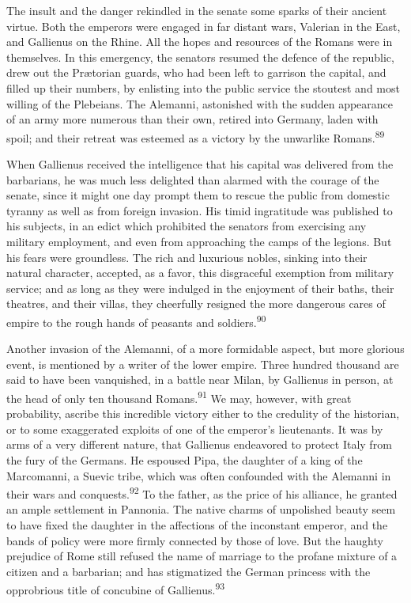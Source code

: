 
The insult and the danger rekindled in the senate some sparks of
their ancient virtue. Both the emperors were engaged in far
distant wars, Valerian in the East, and Gallienus on the Rhine.
All the hopes and resources of the Romans were in themselves. In
this emergency, the senators resumed the defence of the republic,
drew out the Prætorian guards, who had been left to garrison the
capital, and filled up their numbers, by enlisting into the
public service the stoutest and most willing of the Plebeians.
The Alemanni, astonished with the sudden appearance of an army
more numerous than their own, retired into Germany, laden with
spoil; and their retreat was esteemed as a victory by the
unwarlike Romans.\textsuperscript{89}


When Gallienus received the intelligence that his capital was
delivered from the barbarians, he was much less delighted than
alarmed with the courage of the senate, since it might one day
prompt them to rescue the public from domestic tyranny as well as
from foreign invasion. His timid ingratitude was published to his
subjects, in an edict which prohibited the senators from
exercising any military employment, and even from approaching the
camps of the legions. But his fears were groundless. The rich and
luxurious nobles, sinking into their natural character, accepted,
as a favor, this disgraceful exemption from military service; and
as long as they were indulged in the enjoyment of their baths,
their theatres, and their villas, they cheerfully resigned the
more dangerous cares of empire to the rough hands of peasants and
soldiers.\textsuperscript{90}


Another invasion of the Alemanni, of a more formidable aspect,
but more glorious event, is mentioned by a writer of the lower
empire. Three hundred thousand are said to have been vanquished,
in a battle near Milan, by Gallienus in person, at the head of
only ten thousand Romans.\textsuperscript{91} We may, however, with great
probability, ascribe this incredible victory either to the
credulity of the historian, or to some exaggerated exploits of
one of the emperor’s lieutenants. It was by arms of a very
different nature, that Gallienus endeavored to protect Italy from
the fury of the Germans. He espoused Pipa, the daughter of a king
of the Marcomanni, a Suevic tribe, which was often confounded
with the Alemanni in their wars and conquests.\textsuperscript{92} To the father,
as the price of his alliance, he granted an ample settlement in
Pannonia. The native charms of unpolished beauty seem to have
fixed the daughter in the affections of the inconstant emperor,
and the bands of policy were more firmly connected by those of
love. But the haughty prejudice of Rome still refused the name of
marriage to the profane mixture of a citizen and a barbarian; and
has stigmatized the German princess with the opprobrious title of
concubine of Gallienus.\textsuperscript{93}

